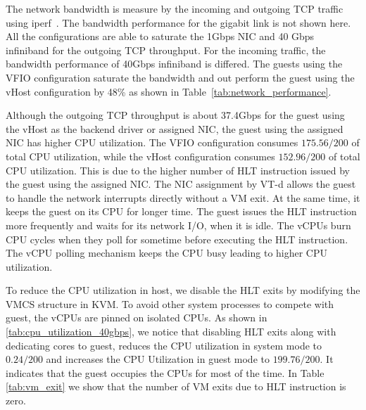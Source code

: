 The network bandwidth is measure by the incoming and outgoing
TCP traffic using iperf~\cite{iperf}. The bandwidth
performance for the gigabit link is not shown here. All the
configurations are able to saturate the 1Gbps NIC and 40 Gbps
infiniband for the outgoing TCP throughput. For the incoming
traffic, the bandwidth performance of 40Gbps infiniband is
differed. The guests using the VFIO configuration saturate the
bandwidth and out perform the guest using the vHost
configuration by 48\% as shown in
Table~\ref{tab:network_performance}.

Although the outgoing TCP throughput is about 37.4Gbps for the
guest using the vHost as the backend driver or assigned NIC,
the guest using the assigned NIC has higher CPU utilization.
The VFIO configuration consumes $175.56/200$ of total CPU
utilization, while the vHost configuration consumes
$152.96/200$ of total CPU utilization. This is due to the
higher number of HLT instruction issued by the guest using the
assigned NIC. The NIC assignment by VT-d allows the guest to
handle the network interrupts directly without a VM exit. At
the same time, it keeps the guest on its CPU for longer time.
The guest issues the HLT instruction more frequently and waits
for its network I/O, when it is idle. The vCPUs burn CPU
cycles when they poll for sometime before executing the HLT
instruction. The vCPU polling mechanism keeps the CPU busy
leading to higher CPU utilization.

To reduce the CPU utilization in host, we disable the HLT
exits by modifying the VMCS structure in KVM. To avoid other
system processes to compete with guest, the vCPUs are pinned
on isolated CPUs. As shown in
\ref{tab:cpu_utilization_40gbps}, we notice that disabling HLT
exits along with dedicating cores to guest, reduces the CPU
utilization in system mode to $0.24/200$ and increases the CPU
Utilization in guest mode to $199.76/200$. It indicates that
the guest occupies the CPUs for most of the time. In Table
\ref{tab:vm_exit} we show that the number of VM exits due to
HLT instruction is zero.
